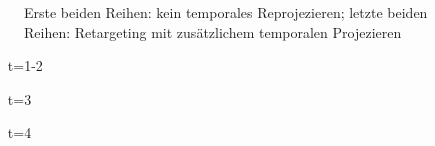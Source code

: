 \begin{figure}[H]
\begin{tcolorbox}[boxrule=4pt,sharp corners=downhill,title=Szene unter Kamerabewegung, fonttitle=\bfseries]
\begin{subfigure}[b]{0.2\linewidth}
         \caption{}
         \label{pic:TemporalRepr_4}
    \end{subfigure}
  \end{tcolorbox}
    \caption{Erste beiden Reihen: kein temporales Reprojezieren; letzte beiden Reihen: Retargeting mit zusätzlichem temporalen Projezieren}
    \label{fig:Auswirkung temporales Projezieren}
\end{figure}

\begin{itemize}
  \item[t=1-2]                  
  \item[t=3] 
  \item[t=4] 
\end{itemize}

